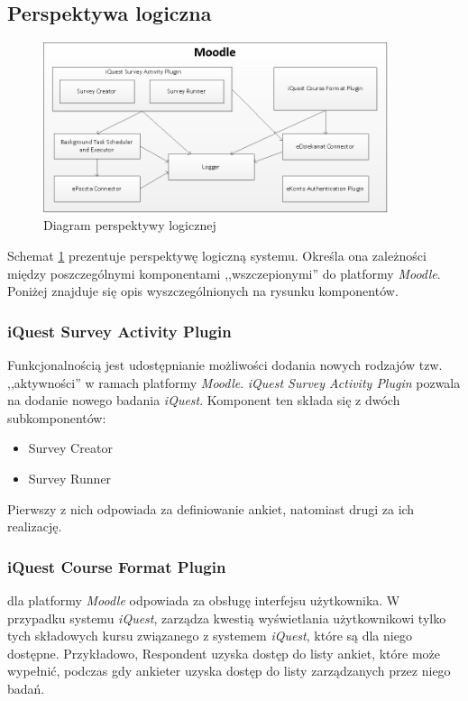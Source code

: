 \subsection{Perspektywa logiczna}
\label{Chapter542}

\begin{figure}[H]
\centering\includegraphics[width=0.9\textwidth]{figures/LogicalView}
\caption{Diagram perspektywy logicznej}\label{rys:PerspektywaLogiczna}
\end{figure}

Schemat \ref{rys:PerspektywaLogiczna} prezentuje perspektywę logiczną systemu. Określa ona zależności między poszczególnymi komponentami ,,wszczepionymi'' do platformy \textit{Moodle}. Poniżej znajduje się opis wyszczególnionych na rysunku komponentów.

\subsubsection{iQuest Survey Activity Plugin}
\label{Chapter5421}
Funkcjonalnością  jest udostępnianie możliwości dodania nowych rodzajów tzw. ,,aktywności'' w ramach platformy \textit{Moodle}. \textit{iQuest Survey Activity Plugin} pozwala na dodanie nowego badania \textit{iQuest}. Komponent ten składa się z dwóch subkomponentów:
\begin{itemize}
\item{Survey Creator}
\item{Survey Runner}
\end{itemize}
Pierwszy z nich odpowiada za definiowanie ankiet, natomiast drugi za ich realizację.

\subsubsection{iQuest Course Format Plugin}
\label{Chapter5422}

 dla platformy \textit{Moodle} odpowiada za obsługę interfejsu użytkownika. W przypadku systemu \textit{iQuest}, zarządza kwestią wyświetlania użytkownikowi tylko tych składowych kursu związanego z systemem \textit{iQuest}, które są dla niego dostępne. Przykładowo, Respondent uzyska dostęp do listy ankiet, które może wypełnić, podczas gdy ankieter uzyska dostęp do listy zarządzanych przez niego badań.

